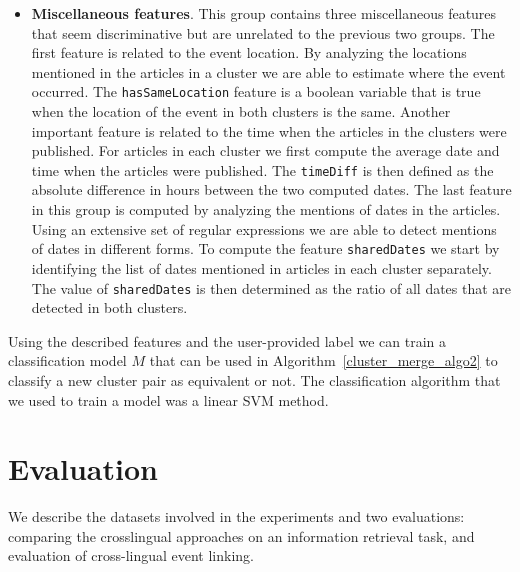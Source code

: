 \documentclass[twoside,11pt]{article}
\begin{document}
\begin{itemize}
\item {\bf Miscellaneous features}. This group contains three miscellaneous features that seem discriminative but are unrelated to the previous two groups. The first feature is related to the event location. By analyzing the locations mentioned in the articles in a cluster we are able to estimate where the event occurred. The \texttt{hasSameLocation} feature is a boolean variable that is true when the location of the event in both clusters is the same. Another important feature is related to the time when the articles in the clusters were published. For articles in each cluster we first compute the average date and time when the articles were published. The \texttt{timeDiff} is then defined as the absolute difference in hours between the two computed dates. The last feature in this group is computed by analyzing the mentions of dates in the articles. Using an extensive set of regular expressions we are able to detect mentions of dates in different forms. To compute the feature \texttt{sharedDates} we start by identifying the list of dates mentioned in articles in each cluster separately. The value of \texttt{sharedDates} is then determined as the ratio of all dates that are detected in both clusters.

\end{itemize}

Using the described features and the user-provided label we can train a classification model $M$ that can be used in Algorithm~\ref{cluster_merge_algo2} to classify a new cluster pair as equivalent or not. The classification algorithm that we used to train a model was a linear SVM method.




\section{Evaluation}

We describe the datasets involved in the experiments and two evaluations: comparing the crosslingual approaches on an information retrieval task, and evaluation of cross-lingual event linking.
\end{document}
